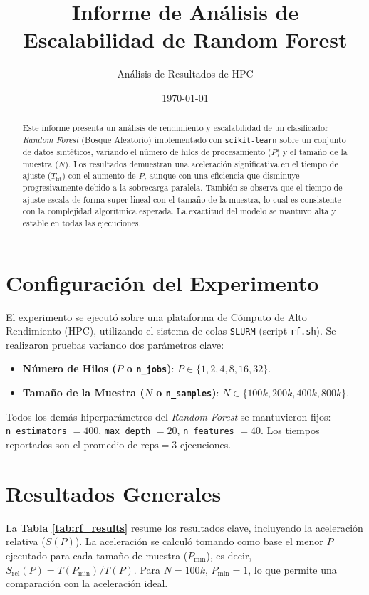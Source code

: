 \documentclass{article}
\title{Informe de Análisis de Escalabilidad de Random Forest}
\author{Análisis de Resultados de HPC}
\date{\today}
\begin{document}
\maketitle

\begin{abstract}
Este informe presenta un análisis de rendimiento y escalabilidad de un clasificador \textit{Random Forest} (Bosque Aleatorio) implementado con \texttt{scikit-learn} sobre un conjunto de datos sintéticos, variando el número de hilos de procesamiento ($P$) y el tamaño de la muestra ($N$). Los resultados demuestran una aceleración significativa en el tiempo de ajuste ($T_{\text{fit}}$) con el aumento de $P$, aunque con una eficiencia que disminuye progresivamente debido a la sobrecarga paralela. También se observa que el tiempo de ajuste escala de forma super-lineal con el tamaño de la muestra, lo cual es consistente con la complejidad algorítmica esperada. La exactitud del modelo se mantuvo alta y estable en todas las ejecuciones.
\end{abstract}

\section{Configuración del Experimento}

El experimento se ejecutó sobre una plataforma de Cómputo de Alto Rendimiento (HPC), utilizando el sistema de colas \texttt{SLURM} (script \texttt{rf.sh}). Se realizaron pruebas variando dos parámetros clave:

\begin{itemize}
    \item \textbf{Número de Hilos ($P$ o \texttt{n\_jobs})}: $P \in \{1, 2, 4, 8, 16, 32\}$.
    \item \textbf{Tamaño de la Muestra ($N$ o \texttt{n\_samples})}: $N \in \{100k, 200k, 400k, 800k\}$.
\end{itemize}

Todos los demás hiperparámetros del \textit{Random Forest} se mantuvieron fijos: \texttt{n\_estimators} $= 400$, \texttt{max\_depth} $= 20$, \texttt{n\_features} $= 40$. Los tiempos reportados son el promedio de $\text{reps}=3$ ejecuciones.

\section{Resultados Generales}

La \textbf{Tabla \ref{tab:rf_results}} resume los resultados clave, incluyendo la aceleración relativa ($S(P)$). La aceleración se calculó tomando como base el menor $P$ ejecutado para cada tamaño de muestra ($P_{\min}$), es decir, $S_{\text{rel}}(P) = T(P_{\min}) / T(P)$. Para $N=100k$, $P_{\min}=1$, lo que permite una comparación con la aceleración ideal.
\end{document}
